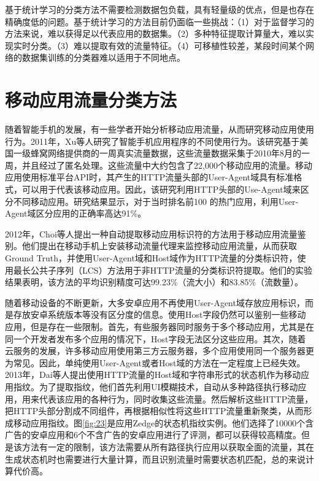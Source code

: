 基于统计学习的分类方法不需要检测数据包负载，具有轻量级的优点，但是也存在精确度低的问题。基于统计学习的方法目前仍面临一些挑战：（1）对于监督学习的方法来说，难以获得足以代表应用的数据集。（2）多种特征提取计算量大，难以实现实时分类。（3）难以提取有效的流量特征。（4）可移植性较差，某段时间某个网络的数据集训练的分类器难以适用于不同地点。


\section{移动应用流量分类方法}
随着智能手机的发展，有一些学者开始分析移动应用流量，从而研究移动应用使用行为。2011年，Xu等人研究了智能手机应用程序的不同使用行为\supercite{xu2011identifying}。该研究基于美国一级蜂窝网络提供商的一周真实流量数据，这些流量数据采集于2010年8月的一周，并且经过了匿名处理。这些流量中大约包含了22,000个移动应用的流量。移动应用使用标准平台API时，其产生的HTTP流量头部的User-Agent域具有标准格式，可以用于代表该移动应用。因此，该研究利用HTTP头部的Use-Agent域来区分不同移动应用。研究结果显示，对于当时排名前100 的热门应用，利用User-Agent域区分应用的正确率高达91\%。

2012年，Choi等人提出一种自动提取移动应用标识符的方法用于移动应用流量鉴别\supercite{choi2012automated}。他们提出在移动手机上安装移动流量代理来监控移动应用流量，从而获取Ground Truth，并使用User-Agent域和Host域作为HTTP流量的分类标识符，使用最长公共子序列（LCS）方法用于非HTTP流量的分类标识符提取。他们的实验结果表明，该方法的平均识别精度可达99.23\%（流大小）和83.85\%（流数量）。

随着移动设备的不断更新，大多安卓应用不再使用User-Agent域存放应用标识，而是存放安卓系统版本等没有区分度的信息。使用Host字段仍然可以鉴别一些移动应用，但是存在一些限制。首先，有些服务器同时服务于多个移动应用，尤其是在同一个开发者发布多个应用的情况下，Host字段无法区分这些应用。其次，随着云服务的发展，许多移动应用使用第三方云服务器，多个应用使用同一个服务器更为常见。因此，单纯使用User-Agent或者Host域的方法在一定程度上已经失效。2013年，Dai等人提出使用HTTP流量的Host域和字符串形式的状态机作为移动应用指纹\supercite{dai2013networkprofiler}。为了提取指纹，他们首先利用UI模糊技术，自动从多种路径执行移动应用，用来代表该应用的各种行为，同时收集这些流量。然后解析这些HTTP流量，把HTTP头部分割成不同组件，再根据相似性将这些HTTP流量重新聚类，从而形成移动应用指纹。图\ref{fig:23}是应用Zedge的状态机指纹实例。他们选择了10000个含广告的安卓应用和6个不含广告的安卓应用进行了评测，都可以获得较高精度。但是该方法有一定的限制，该方法需要从所有路径执行应用以获取全面的流量，其在生成状态机时也需要进行大量计算，而且识别流量时需要状态机匹配，总的来说计算代价高。

